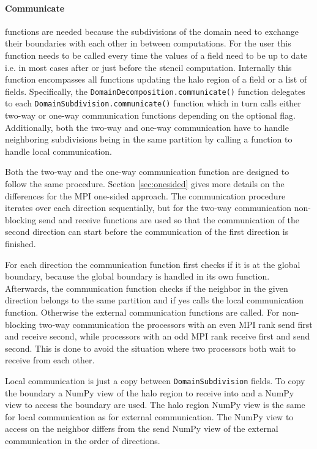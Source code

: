 \paragraph{Communicate } functions are needed because the subdivisions of the domain need to exchange their boundaries with each other in between computations.
For the user this function needs to be called every time the values of a field need to be up to date i.e. in most cases after or just before the stencil computation.
Internally this function encompasses all functions updating the halo region of a field or a list of fields.
Specifically, the \texttt{DomainDecomposition.communicate()} function delegates to each \texttt{DomainSubdivision.communicate()} function which in turn calls either two-way or one-way communication functions depending on the optional flag.
Additionally, both the two-way and one-way communication have to handle neighboring subdivisions being in the same partition by calling a function to handle local communication.

Both the two-way and the one-way communication function are designed to follow the same procedure.
Section \ref{sec:onesided} gives more details on the differences for the MPI one-sided approach.
The communication procedure iterates over each direction sequentially, but for the two-way communication non-blocking send and receive functions are used so that the communication of the second direction can start before the communication of the first direction is finished.

For each direction the communication function first checks if it is at the global boundary, because the global boundary is handled in its own function.
Afterwards, the communication function checks if the neighbor in the given direction belongs to the same partition and if yes calls the local communication function.
Otherwise the external communication functions are called.
For non-blocking two-way communication the processors with an even MPI rank send first and receive second, while processors with an odd MPI rank receive first and send second.
This is done to avoid the situation where two processors both wait to receive from each other.

Local communication is just a copy between \texttt{DomainSubdivision} fields.
To copy the boundary a NumPy view of the halo region to receive into and a NumPy view to access the boundary are used.
The halo region NumPy view is the same for local communication as for external communication.
The NumPy view to access on the neighbor differs from the send NumPy view of the external communication in the order of directions.

